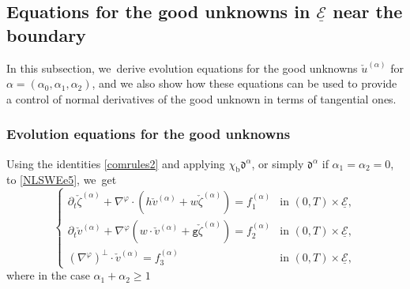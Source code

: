 \documentclass[11pt]{article}
\newcommand{\gr}{{\mathtt g}}
\newcommand{\dt}{\partial_t}
\newcommand{\cE}{{\mathcal E}}
\newcommand{\ul}[1]{\underline{#1}}
\theoremstyle{definition}
\begin{document}
\subsection{Equations for the good unknowns in $\ul{\cE}$ near the boundary}\label{subsect:EGUe}
In this subsection, we~derive evolution equations for the good unknowns $\check{u}^{(\alpha)}$ for $\alpha=(\alpha_0,\alpha_1,\alpha_2)$,
and we also show how these equations can be used to provide a control of normal derivatives of the good unknown in terms of tangential ones.

\subsubsection{Evolution equations for the good unknowns}
Using the identities \eqref{comrules2} and applying $\chi_\mathrm{b}\mathfrak{d}^{\alpha}$,
or simply $\mathfrak{d}^{\alpha}$ if $\alpha_1=\alpha_2=0$, to \eqref{NLSWEe5}, we~get
\begin{equation}\label{QLSWEe}
\begin{cases}
\dt\check{\zeta}^{(\alpha)}+\nabla^\varphi\cdot(h\check{v}^{(\alpha)}+w\check{\zeta}^{(\alpha)}) = f_1^{(\alpha)} &\text{in } (0,T)\times\ul{\cE}, \\
\dt\check{v}^{(\alpha)}+\nabla^\varphi(w\cdot\check{v}^{(\alpha)}+\gr\check{\zeta}^{(\alpha)}) = f_2^{(\alpha)} &\text{in } (0,T)\times\ul{\cE}, \\
(\nabla^\varphi)^\perp\cdot\check{v}^{(\alpha)} = f_3^{(\alpha)} &\text{in } (0,T)\times\ul{\cE},
\end{cases}
\end{equation}
where in the case $\alpha_1+\alpha_2\geq1$
\end{document}

